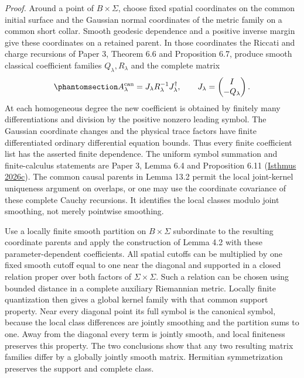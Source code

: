 \documentclass[
  english,
  11pt,
  reqno]{amsart}
\begin{document}
\emph{Proof.} Around a point of \(B\times\Sigma\), choose fixed spatial
coordinates on the common initial surface and the Gaussian normal
coordinates of the metric family on a common short collar. Smooth
geodesic dependence and a positive inverse margin give these coordinates
on a retained parent. In those coordinates the Riccati and charge
recursions of Paper 3, Theorem 6.6 and Proposition 6.7, produce smooth
classical coefficient families \(Q_\lambda,R_\lambda\) and the complete
matrix
\begin{equation}\protect\phantomsection\label{eq:family-local-cauchy-factorization}{
A^{\mathrm{can}}_\lambda
=J_\lambda R_\lambda^{-1}J_\lambda^{\dagger},
\qquad J_\lambda=\begin{pmatrix}I\\-Q_\lambda\end{pmatrix}.
}\end{equation} At each homogeneous degree the new coefficient is
obtained by finitely many differentiations and division by the positive
nonzero leading symbol. The Gaussian coordinate changes and the physical
trace factors have finite differentiated ordinary differential equation
bounds. Thus every finite coefficient list has the asserted finite
dependence. The uniform symbol summation and finite-calculus statements
are Paper 3, Lemma 6.4 and Proposition 6.11
(\hyperref[ref-IsthmusSmooth2026]{Isthmus 2026c}). The common causal
parents in Lemma 13.2 permit the local joint-kernel uniqueness argument
on overlaps, or one may use the coordinate covariance of these complete
Cauchy recursions. It identifies the local classes modulo joint
smoothing, not merely pointwise smoothing.

Use a locally finite smooth partition on \(B\times\Sigma\) subordinate
to the resulting coordinate parents and apply the construction of Lemma
4.2 with these parameter-dependent coefficients. All spatial cutoffs can
be multiplied by one fixed smooth cutoff equal to one near the diagonal
and supported in a closed relation proper over both factors of
\(\Sigma\times\Sigma\). Such a relation can be chosen using bounded
distance in a complete auxiliary Riemannian metric. Locally finite
quantization then gives a global kernel family with that common support
property. Near every diagonal point its full symbol is the canonical
symbol, because the local class differences are jointly smoothing and
the partition sums to one. Away from the diagonal every term is jointly
smooth, and local finiteness preserves this property. The two
conclusions show that any two resulting matrix families differ by a
globally jointly smooth matrix. Hermitian symmetrization preserves the
support and complete class.
\end{document}
